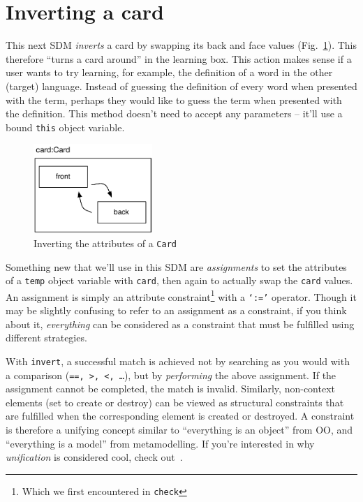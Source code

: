 \newpage
\hypertarget{sec:invertCard}{}
\section{Inverting a card}
\genHeader

This next SDM \emph{inverts} a card by swapping its back and face values (Fig.~\ref{fig:goal_invert}). This therefore ``turns a card around'' in the learning
box. This action makes sense if a user wants to try learning, for example, the definition of a word in the other (target) language. Instead of guessing the
definition of every word when presented with the term, perhaps they would like to guess the term when presented with the definition. This method doesn't need to
accept any parameters -- it'll use a bound \texttt{this} object variable.

\vspace{0.5cm}

\begin{figure}[htbp]
	\centering
    \includegraphics[width=0.4\textwidth]{goal_invert.pdf}
 	\caption{Inverting the attributes of a \texttt{Card}}
 	\label{fig:goal_invert}
\end{figure}
\FloatBarrier

Something new that we'll use in this SDM are \emph{assignments} to set the attributes of a \texttt{temp} object variable with \texttt{card},
then again to actually swap the \texttt{card} values. An assignment is simply an attribute constraint\footnote{Which we first encountered in \texttt{check}}
with a \texttt{`:='} operator. Though it may be slightly confusing to refer to an assignment as a constraint, if you think about it, \emph{everything} can be
considered as a constraint that must be fulfilled using different strategies.

With \texttt{invert}, a successful match is achieved not by searching as you would with a comparison (\texttt{==, >, <, \ldots}), but by \emph{performing} the
above assignment. If the assignment cannot be completed, the match is invalid. Similarly, non-context elements (set to create or destroy) can be viewed as
structural constraints that are fulfilled when the corresponding element is created or destroyed.  A constraint is therefore a unifying concept similar to
``everything is an object'' from OO, and ``everything is a model'' from metamodelling.  If you're interested in why \emph{unification} is considered cool, check
out~\cite{BEZ05}.








